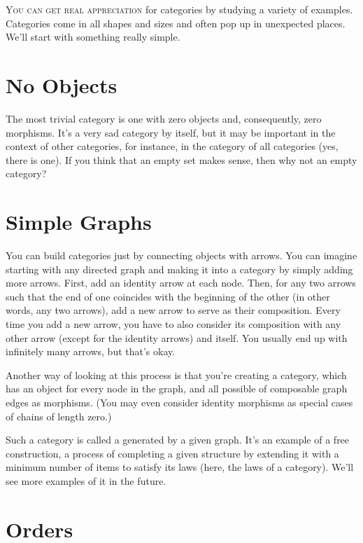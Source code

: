 \lettrine[lhang=0.17]{Y}{ou can get real appreciation} for categories by studying a variety of
examples. Categories come in all shapes and sizes and often pop up in
unexpected places. We'll start with something really simple.

\section{No Objects}\label{no-objects}

The most trivial category is one with zero objects and, consequently,
zero morphisms. It's a very sad category by itself, but it may be
important in the context of other categories, for instance, in the
category of all categories (yes, there is one). If you think that an
empty set makes sense, then why not an empty category?

\section{Simple Graphs}\label{simple-graphs}

You can build categories just by connecting objects with arrows. You can
imagine starting with any directed graph and making it into a category
by simply adding more arrows. First, add an identity arrow at each node.
Then, for any two arrows such that the end of one coincides with the
beginning of the other (in other words, any two 
arrows), add a new arrow to serve as their composition. Every time you
add a new arrow, you have to also consider its composition with any
other arrow (except for the identity arrows) and itself. You usually end
up with infinitely many arrows, but that's okay.

Another way of looking at this process is that you're creating a
category, which has an object for every node in the graph, and all
possible  of composable graph edges as morphisms. (You may
even consider identity morphisms as special cases of chains of length
zero.)

Such a category is called a  generated by a given
graph. It's an example of a free construction, a process of completing a
given structure by extending it with a minimum number of items to
satisfy its laws (here, the laws of a category). We'll see more examples
of it in the future.

\section{Orders}\label{orders}

